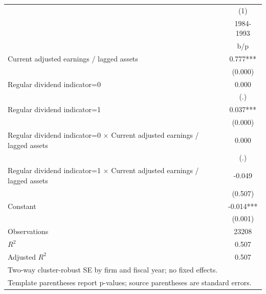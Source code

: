 {
\def\sym#1{\ifmmode^{#1}\else\(^{#1}\)\fi}
\begin{tabular}{l*{1}{c}}
\hline\hline
                    &\multicolumn{1}{c}{(1)}\\
                    &\multicolumn{1}{c}{1984-1993}\\
                    &         b/p   \\
\hline
Current adjusted earnings / lagged assets&       0.777***\\
                    &     (0.000)   \\
Regular dividend indicator=0&       0.000   \\
                    &         (.)   \\
Regular dividend indicator=1&       0.037***\\
                    &     (0.000)   \\
Regular dividend indicator=0 $\times$ Current adjusted earnings / lagged assets&       0.000   \\
                    &         (.)   \\
Regular dividend indicator=1 $\times$ Current adjusted earnings / lagged assets&      -0.049   \\
                    &     (0.507)   \\
Constant            &      -0.014***\\
                    &     (0.001)   \\
\hline
Observations        &       23208   \\
\(R^{2}\)           &       0.507   \\
Adjusted \(R^{2}\)  &       0.507   \\
\hline\hline
\multicolumn{2}{l}{\footnotesize Two-way cluster-robust SE by firm and fiscal year; no fixed effects.}\\
\multicolumn{2}{l}{\footnotesize Template parentheses report p-values; source parentheses are standard errors.}\\
\end{tabular}
}
